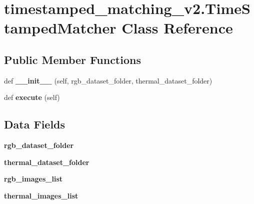 \hypertarget{classtimestamped__matching__v2_1_1TimeStampedMatcher}{}\section{timestamped\+\_\+matching\+\_\+v2.\+Time\+Stamped\+Matcher Class Reference}
\label{classtimestamped__matching__v2_1_1TimeStampedMatcher}
\subsection*{Public Member Functions}
\begin{DoxyCompactItemize}
\item 
\mbox{\label{classtimestamped__matching__v2_1_1TimeStampedMatcher_a980d4fd32885f997f607633362d46f28}} 
def {\bfseries \+\_\+\+\_\+init\+\_\+\+\_\+} (self, rgb\+\_\+dataset\+\_\+folder, thermal\+\_\+dataset\+\_\+folder)
\item 
\mbox{\label{classtimestamped__matching__v2_1_1TimeStampedMatcher_a687da4e5206f9c73ff1d0c8fb1dbecbf}} 
def {\bfseries execute} (self)
\end{DoxyCompactItemize}
\subsection*{Data Fields}
\begin{DoxyCompactItemize}
\item 
\mbox{\label{classtimestamped__matching__v2_1_1TimeStampedMatcher_ad107765aaa0ebc0cc8bfdcf9348f5d9e}} 
{\bfseries rgb\+\_\+dataset\+\_\+folder}
\item 
\mbox{\label{classtimestamped__matching__v2_1_1TimeStampedMatcher_aa1054a9158bec1f652f59dfea768f6b6}} 
{\bfseries thermal\+\_\+dataset\+\_\+folder}
\item 
\mbox{\label{classtimestamped__matching__v2_1_1TimeStampedMatcher_af3fd7880d72499a8f796817ca251ec79}} 
{\bfseries rgb\+\_\+images\+\_\+list}
\item 
\mbox{\label{classtimestamped__matching__v2_1_1TimeStampedMatcher_a55a4de4eb2b0a8ac5d8779d5b9b2de29}} 
{\bfseries thermal\+\_\+images\+\_\+list}
\end{DoxyCompactItemize}


